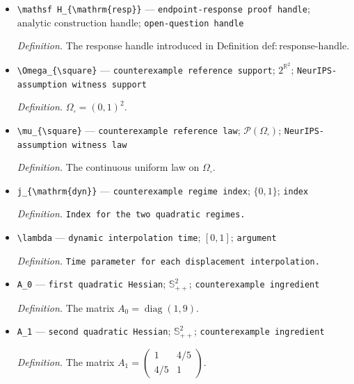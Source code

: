 \documentclass{article}
\begin{document}
\begin{itemize}
  \item \texttt{\textbackslash{}\allowbreak{}mathsf H\_\allowbreak{}\{\textbackslash{}\allowbreak{}mathrm\{resp\}\allowbreak{}\}\allowbreak{}} --- \texttt{endpoint-\allowbreak{}response proof handle}; \(\text{analytic construction handle}\); \texttt{open-\allowbreak{}question handle}
  \par\smallskip\noindent\emph{Definition.} The response handle introduced in Definition \(\mathrm{def:response\text{-}handle}\).
  \item \texttt{\textbackslash{}\allowbreak{}Omega\_\allowbreak{}\{\textbackslash{}\allowbreak{}square\}\allowbreak{}} --- \texttt{counterexample reference support}; \(2^{\mathbb R^2}\); \texttt{NeurIPS-\allowbreak{}assumption witness support}
  \par\smallskip\noindent\emph{Definition.} \(\Omega_{\square}=(0,1)^2\).
  \item \texttt{\textbackslash{}\allowbreak{}mu\_\allowbreak{}\{\textbackslash{}\allowbreak{}square\}\allowbreak{}} --- \texttt{counterexample reference law}; \(\mathcal P(\Omega_{\square})\); \texttt{NeurIPS-\allowbreak{}assumption witness law}
  \par\smallskip\noindent\emph{Definition.} The continuous uniform law on \(\Omega_{\square}\).
  \item \texttt{j\_\allowbreak{}\{\textbackslash{}\allowbreak{}mathrm\{dyn\}\allowbreak{}\}\allowbreak{}} --- \texttt{counterexample regime index}; \(\{0,1\}\); \texttt{index}
  \par\smallskip\noindent\emph{Definition.} \texttt{Index for the two quadratic regimes.}
  \item \texttt{\textbackslash{}\allowbreak{}lambda} --- \texttt{dynamic interpolation time}; \([0,1]\); \texttt{argument}
  \par\smallskip\noindent\emph{Definition.} \texttt{Time parameter for each displacement interpolation.}
  \item \texttt{A\_\allowbreak{}0} --- \texttt{first quadratic Hessian}; \(\mathbb S_{++}^2\); \texttt{counterexample ingredient}
  \par\smallskip\noindent\emph{Definition.} The matrix \(A_0=\operatorname{diag}(1,9)\).
  \item \texttt{A\_\allowbreak{}1} --- \texttt{second quadratic Hessian}; \(\mathbb S_{++}^2\); \texttt{counterexample ingredient}
  \par\smallskip\noindent\emph{Definition.} The matrix \(A_1=\begin{pmatrix}1&4/5\\4/5&1\end{pmatrix}\).

\end{itemize}
\end{document}
